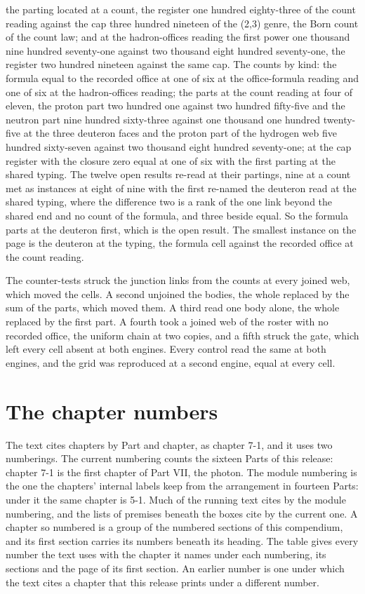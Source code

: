 \begin{chproof}[finite]
the parting located at a count, the register one hundred eighty-three of the count reading against the cap three hundred nineteen of the (2,3) genre, the Born count of the count law; and at the hadron-offices reading the first power one thousand nine hundred seventy-one against two thousand eight hundred seventy-one, the register two hundred nineteen against the same cap. The counts by kind: the formula equal to the recorded office at one of six at the office-formula reading and one of six at the hadron-offices reading; the parts at the count reading at four of eleven, the proton part two hundred one against two hundred fifty-five and the neutron part nine hundred sixty-three against one thousand one hundred twenty-five at the three deuteron faces and the proton part of the hydrogen web five hundred sixty-seven against two thousand eight hundred seventy-one; at the cap register with the closure zero equal at one of six with the first parting at the shared typing. The twelve open results re-read at their partings, nine at a count met as instances at eight of nine with the first re-named the deuteron read at the shared typing, where the difference two is a rank of the one link beyond the shared end and no count of the formula, and three beside equal. So the formula parts at the deuteron first, which is the open result. The smallest instance on the page is the deuteron at the typing, the formula cell against the recorded office at the count reading.

The counter-tests struck the junction links from the counts at every joined web, which moved the cells. A second unjoined the bodies, the whole replaced by the sum of the parts, which moved them. A third read one body alone, the whole replaced by the first part. A fourth took a joined web of the roster with no recorded office, the uniform chain at two copies, and a fifth struck the gate, which left every cell absent at both engines. Every control read the same at both engines, and the grid was reproduced at a second engine, equal at every cell.
\end{chproof}
\label{app:bibliography}
\section{The chapter numbers}\label{app:chapter-numbers}
The text cites chapters by Part and chapter, as chapter 7-1, and it uses two numberings. The current numbering counts the sixteen Parts of this release: chapter 7-1 is the first chapter of Part VII, the photon. The module numbering is the one the chapters' internal labels keep from the arrangement in fourteen Parts: under it the same chapter is 5-1. Much of the running text cites by the module numbering, and the lists of premises beneath the boxes cite by the current one. A chapter so numbered is a group of the numbered sections of this compendium, and its first section carries its numbers beneath its heading. The table gives every number the text uses with the chapter it names under each numbering, its sections and the page of its first section. An earlier number is one under which the text cites a chapter that this release prints under a different number.

